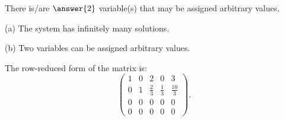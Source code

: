 \documentclass{ximera}
\begin{document}
     \begin{exercise}
       There is/are $\answer{2}$ variable(s) that may be assigned arbitrary values.

\begin{solution}

\ans (a) The system has infinitely many solutions.

(b) Two variables can be assigned arbitrary values.

\soln The row-reduced form of the matrix is:
\[
\left(\begin{array}{rrrr|r} 1 & 0 & 2 & 0 & 3 \\ 0 & 1 & \frac{2}{3}
& \frac{1}{3} & \frac{10}{3} \\ 0 & 0 & 0 & 0 & 0 \\ 0 & 0 & 0 & 0 & 0
\end{array}\right).
\]


\end{solution}
     \end{exercise}
\end{document}
